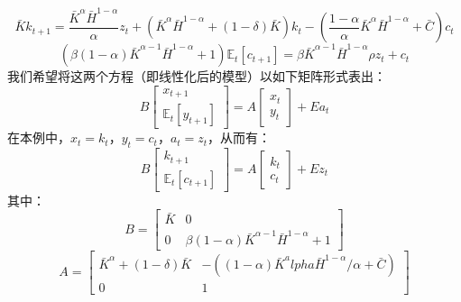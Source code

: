 \begin{example}
    \begin{equation*}
        \bar{K} k_{t+1}=\frac{\bar{K}^\alpha \bar{H}^{1-\alpha}}{\alpha}z_t + 
            \left(\bar{K}^\alpha \bar{H}^{1-\alpha}+(1-\delta) \bar{K}\right) 
            k_t-\left(\frac{1-\alpha}{\alpha} \bar{K}^\alpha \bar{H}^{1-\alpha}+\bar{C}\right) c_t
    \end{equation*}
    \begin{equation*}
        \left(\beta(1-\alpha) \bar{K}^{\alpha-1} \bar{H}^{1-\alpha}+1\right) \mathbb{E}_t\left[c_{t+1}\right] = 
            \beta \bar{K}^{\alpha-1} \bar{H}^{1-\alpha} \rho z_t+c_t
    \end{equation*}
    我们希望将这两个方程（即线性化后的模型）以如下矩阵形式表出：
    \begin{equation*}
        B
        \begin{bmatrix}
            x_{t+1} \\
            \mathbb{E}_t[y_{t+1}]
        \end{bmatrix}
        =
        A
        \begin{bmatrix}
            x_t \\
            y_t
        \end{bmatrix}
        + E a_t
    \end{equation*}
    在本例中，$x_t = k_t$，$y_t = c_t$，$a_t = z_t$，从而有：
    \begin{equation*}
        B
        \begin{bmatrix}
            k_{t+1} \\
            \mathbb{E}_t[c_{t+1}]
        \end{bmatrix}
        =
        A
        \begin{bmatrix}
            k_t \\
            c_t
        \end{bmatrix}
        + E z_t
    \end{equation*}
    其中：
    \[
        B = 
        \begin{bmatrix}
            \bar{K} & 0 \\
            0 & \beta(1-\alpha)\bar{K}^{\alpha-1}\bar{H}^{1-\alpha} + 1
        \end{bmatrix}
    \]
    \[
        A = 
        \begin{bmatrix}
            \bar{K}^\alpha + (1-\delta)\bar{K} & -\left(\left(1-\alpha\right)\bar{K}^alpha 
                \bar{H}^{1-\alpha}/\alpha + \bar{C}\right) \\
            0 & 1
        \end{bmatrix}
\]
\end{example}
